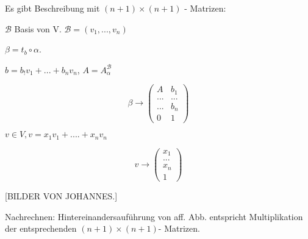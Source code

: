 \documentclass[a4paper, openany]{book}
\begin{document}
\begin{enumerate}[label=(\alph*)]
        Es gibt Beschreibung mit $(n+1) \times (n+1)$ - Matrizen:

        \par \medskip

        $\mathcal{B}$ Basis von V. $\mathcal{B} = (v_1, ..., v_n)$

        $\beta = t_b \circ \alpha$.

        \par \medskip

        $b = b_!v_1 + ... + b_nv_n$, $A = A_{\alpha}^{\mathcal{B}}$

        \[ \beta \rightarrow \begin{pmatrix}A & b_1 \\ ... & ... \\ ... & b_n \\ 0 & 1 \end{pmatrix} \]

        $v \in V, v = x_1v_1 + .... + x_n v_n$

        \[ v \rightarrow \begin{pmatrix}x_1 \\ ... \\ x_n \\ 1 \end{pmatrix} \]

        [BILDER VON JOHANNES.]

        \par \medskip


        Nachrechnen: Hintereinandersauführung von aff. Abb. entspricht Multiplikation der entsprechenden $(n+1) \times (n+1)$- Matrizen.

        \end{enumerate}


        

        
\end{document}
